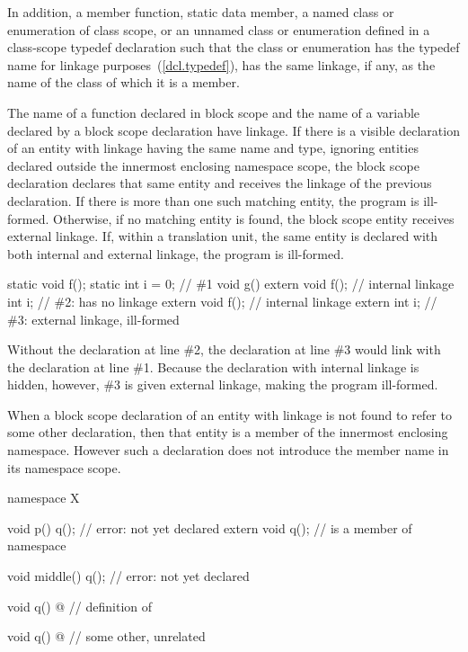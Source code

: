 \pnum
In addition, a member function, static data member, a named class or
enumeration of class scope, or an unnamed class or enumeration defined
in a class-scope typedef declaration such that the class or enumeration
has the typedef name for linkage purposes~(\ref{dcl.typedef}), has
the same linkage, if any, as the name of the class of which it is a
member.

\pnum
The name of a function declared in block scope and the name of a variable declared by a
block scope  declaration have linkage. If there is a visible declaration
of an entity with linkage having the same name and type, ignoring entities declared
outside the innermost enclosing namespace scope, the block scope declaration declares
that same entity and receives the linkage of the previous declaration. If there is more
than one such matching entity, the program is ill-formed. Otherwise, if no matching
entity is found, the block scope entity receives external linkage.
If, within a translation unit, the same entity is declared with both
internal and external linkage, the program is ill-formed.
\begin{example}
\begin{codeblock}
static void f();
static int i = 0;               // \#1
void g() {
  extern void f();              // internal linkage
  int i;                        // \#2:  has no linkage
  {
    extern void f();            // internal linkage
    extern int i;               // \#3: external linkage, ill-formed
  }
}
\end{codeblock}

Without the declaration at line \#2,
the declaration at line \#3 would link with the declaration at line \#1.
Because the declaration with internal linkage is hidden, however,
\#3 is given external linkage, making the program ill-formed.
\end{example}

\pnum
When a block scope declaration of an entity with linkage is not found to
refer to some other declaration, then that entity is a member of the
innermost enclosing namespace. However such a declaration does not
introduce the member name in its namespace scope. \begin{example}

\begin{codeblock}
namespace X {
  void p() {
    q();                        // error:  not yet declared
    extern void q();            //  is a member of namespace 
  }

  void middle() {
    q();                        // error:  not yet declared
  }

  void q() { @\commentellip@ }        // definition of 
}

void q() { @\commentellip@ }          // some other, unrelated 
\end{codeblock}
\end{example}

